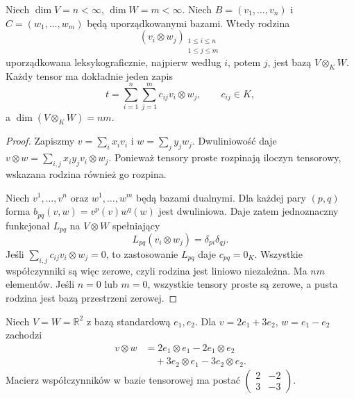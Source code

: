 \begin{twierdzenie}
\label{thm:lin10-baza}
Niech \(\dim V=n<\infty\),
\(\dim W=m<\infty\).
Niech \(B=(v_1,\ldots,v_n)\)
i \(C=(w_1,\ldots,w_m)\)
będą uporządkowanymi bazami.
Wtedy rodzina
\[
 (v_i\otimes w_j)_{\substack{
 1\leq i\leq n\\1\leq j\leq m}}
\]
uporządkowana leksykograficznie,
najpierw według \(i\), potem \(j\),
jest bazą \(V\otimes_KW\).
Każdy tensor ma dokładnie jeden zapis
\[
 t=\sum_{i=1}^n\sum_{j=1}^m
   c_{ij}v_i\otimes w_j,\qquad c_{ij}\in K,
\]
a \(\dim(V\otimes_KW)=nm\).
\end{twierdzenie}
\begin{proof}
Zapiszmy
\(v=\sum_i x_iv_i\) i
\(w=\sum_j y_jw_j\).
Dwuliniowość daje
\(v\otimes w=\sum_{i,j}
x_iy_jv_i\otimes w_j\).
Ponieważ tensory proste rozpinają
iloczyn tensorowy, wskazana rodzina
również go rozpina.

Niech \(v^1,\ldots,v^n\)
oraz \(w^1,\ldots,w^m\)
będą bazami dualnymi.
Dla każdej pary \((p,q)\)
forma
\(b_{pq}(v,w)=v^p(v)w^q(w)\)
jest dwuliniowa.
Daje zatem jednoznaczny
funkcjonał \(L_{pq}\) na
\(V\otimes W\) spełniający
\[
 L_{pq}(v_i\otimes w_j)
 =\delta_{pi}\delta_{qj}.
\]
Jeśli
\(\sum_{i,j}c_{ij}v_i\otimes w_j=0\),
to zastosowanie \(L_{pq}\)
daje \(c_{pq}=0_K\).
Wszystkie współczynniki
są więc zerowe, czyli
rodzina jest liniowo niezależna.
Ma \(nm\) elementów.
Jeśli \(n=0\) lub \(m=0\),
wszystkie tensory proste są zerowe,
a pusta rodzina jest bazą
przestrzeni zerowej.
\end{proof}

\begin{przyklad}
\label{prz:lin10-wspolrzedne}
Niech \(V=W=\mathbb R^2\)
z bazą standardową \(e_1,e_2\).
Dla \(v=2e_1+3e_2\),
\(w=e_1-e_2\) zachodzi
\[
 \begin{aligned}
 v\otimes w
 &=2e_1\otimes e_1-2e_1\otimes e_2\\
 &\quad+3e_2\otimes e_1-3e_2\otimes e_2.
 \end{aligned}
\]
Macierz współczynników
w bazie tensorowej ma postać
\(\begin{pmatrix}2&-2\\3&-3\end{pmatrix}\).
\end{przyklad}

